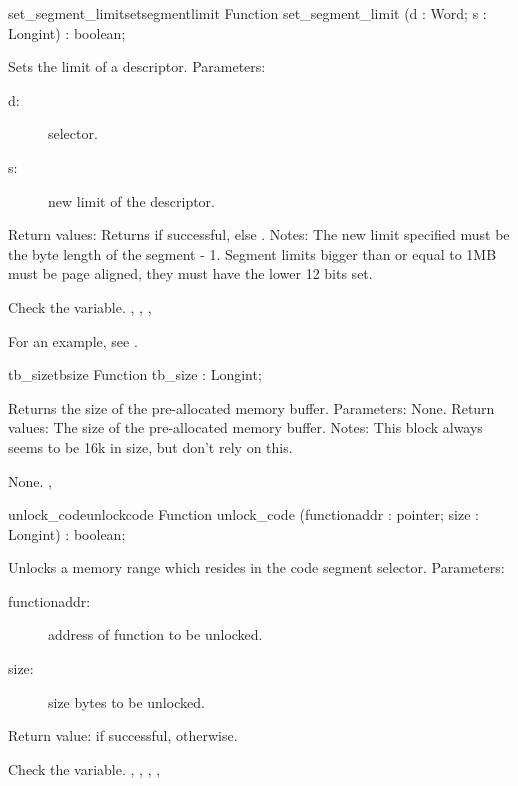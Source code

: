 \begin{functionl}{set\_segment\_limit}{setsegmentlimit}
\Declaration
Function set\_segment\_limit (d : Word; s : Longint) : boolean;

\Description
Sets the limit of a descriptor.
Parameters: 
\begin{description}
\item[d:\ ] selector.
\item[s:\ ] new limit of the descriptor.
\end{description}
Return values: Returns  if successful, else .
Notes: The new limit specified must be the byte length of the segment - 1.
Segment limits bigger than or equal to 1MB must be page aligned, they must
have the lower 12 bits set.

\Errors
 Check the  variable.
\SeeAlso
{},
,
, 

\end{functionl}
For an example, see 
.
\begin{functionl}{tb\_size}{tbsize}
\Declaration
Function tb\_size  : Longint;

\Description
Returns the size of the pre-allocated \dos memory buffer.
Parameters: None.
Return values: The size of the pre-allocated \dos memory buffer.
Notes:
This block always seems to be 16k in size, but don't rely on this.

\Errors
None.
\SeeAlso
{}, 
\end{functionl}
\begin{functionl}{unlock\_code}{unlockcode}
\Declaration
Function unlock\_code (functionaddr : pointer; size : Longint) : boolean;

\Description
Unlocks a memory range which resides in the code segment selector.
Parameters:
\begin{description}
\item[functionaddr:\ ] address of function to be unlocked. 
\item[size:\ ] size bytes to be unlocked.
\end{description}
Return value:  if successful,  otherwise.

\Errors
 Check the  variable.
\SeeAlso
{},
 ,
,
,
\end{functionl}
